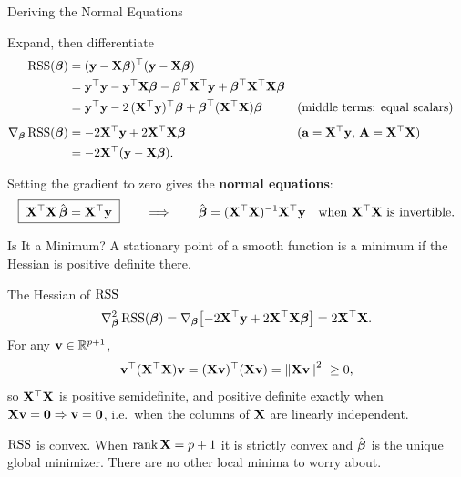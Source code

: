 \documentclass[11pt,aspectratio=169]{beamer}
\begin{document}
\begin{frame}{Deriving the Normal Equations}
\begin{derivation}{Expand, then differentiate}
\begin{align*}
\RSS(\vbeta)&=(\vy-\vX\vbeta)\T(\vy-\vX\vbeta)\\
&=\vy\T\vy-\vy\T\vX\vbeta-\vbeta\T\vX\T\vy+\vbeta\T\vX\T\vX\vbeta\\
&=\vy\T\vy-2\,(\vX\T\vy)\T\vbeta+\vbeta\T(\vX\T\vX)\vbeta
&&\text{(middle terms: equal scalars)}\\[4pt]
\nabla_{\vbeta}\RSS(\vbeta)&=-2\vX\T\vy+2\vX\T\vX\vbeta
&&\text{($\va=\vX\T\vy$,\ $\vA=\vX\T\vX$)}\\
&=-2\vX\T(\vy-\vX\vbeta).
\end{align*}
\end{derivation}
Setting the gradient to zero gives the \textbf{normal equations}:
\[
\boxed{\;\vX\T\vX\,\hat\vbeta=\vX\T\vy\;}
\qquad\Longrightarrow\qquad
\hat\vbeta=(\vX\T\vX)\inv\vX\T\vy\quad\text{when }\vX\T\vX\text{ is invertible.}
\]
\end{frame}

\begin{frame}{Is It a Minimum?}\small
A stationary point of a smooth function is a minimum if the Hessian is positive definite there.
\begin{derivation}{The Hessian of $\RSS$}
\[
\nabla^2_{\vbeta}\RSS(\vbeta)=\nabla_{\vbeta}\bigl[-2\vX\T\vy+2\vX\T\vX\vbeta\bigr]=2\vX\T\vX .
\]
For any $\vv\in\R^{p+1}$,
\[
\vv\T(\vX\T\vX)\vv=(\vX\vv)\T(\vX\vv)=\norm{\vX\vv}^2\ \ge 0,
\]
so $\vX\T\vX$ is positive semidefinite, and positive definite exactly when $\vX\vv=\vzero\Rightarrow\vv=\vzero$,
i.e.\ when the columns of $\vX$ are linearly independent.
\end{derivation}
\begin{keypoint}
$\RSS$ is convex. When $\rank\vX=p+1$ it is strictly convex and $\hat\vbeta$ is the unique global
minimizer. There are no other local minima to worry about.
\end{keypoint}
\end{frame}
\end{document}
